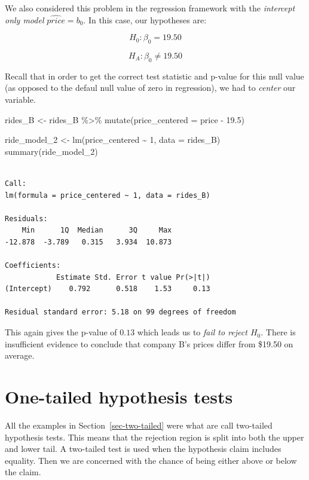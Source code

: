 \documentclass[
  letterpaper,
  DIV=11,
  numbers=noendperiod]{scrreprt}
\newenvironment{Shaded}{\begin{snugshade}}{\end{snugshade}}
\newcommand{\AttributeTok}[1]{\textcolor[rgb]{0.40,0.45,0.13}{#1}}
\newcommand{\DecValTok}[1]{\textcolor[rgb]{0.68,0.00,0.00}{#1}}
\newcommand{\FloatTok}[1]{\textcolor[rgb]{0.68,0.00,0.00}{#1}}
\newcommand{\FunctionTok}[1]{\textcolor[rgb]{0.28,0.35,0.67}{#1}}
\newcommand{\NormalTok}[1]{\textcolor[rgb]{0.00,0.23,0.31}{#1}}
\newcommand{\OtherTok}[1]{\textcolor[rgb]{0.00,0.23,0.31}{#1}}
\newcommand{\SpecialCharTok}[1]{\textcolor[rgb]{0.37,0.37,0.37}{#1}}
\theoremstyle{definition}
\theoremstyle{remark}
\begin{document}
We also considered this problem in the regression framework with the
\emph{intercept only model} \(\widehat{price} = b_0\). In this case, our
hypotheses are:

\[H_0: \beta_0 = 19.50\]

\[H_A: \beta_0 \neq 19.50\]

Recall that in order to get the correct test statistic and p-value for
this null value (as opposed to the defaul null value of zero in
regression), we had to \emph{center} our variable.

\begin{Shaded}
\begin{Highlighting}[]
\NormalTok{rides\_B }\OtherTok{\textless{}{-}}\NormalTok{ rides\_B }\SpecialCharTok{\%\textgreater{}\%} 
  \FunctionTok{mutate}\NormalTok{(}\AttributeTok{price\_centered =}\NormalTok{ price }\SpecialCharTok{{-}} \FloatTok{19.5}\NormalTok{)}

\NormalTok{ride\_model\_2 }\OtherTok{\textless{}{-}} \FunctionTok{lm}\NormalTok{(price\_centered }\SpecialCharTok{\textasciitilde{}} \DecValTok{1}\NormalTok{, }\AttributeTok{data =}\NormalTok{ rides\_B)}
\FunctionTok{summary}\NormalTok{(ride\_model\_2)}
\end{Highlighting}
\end{Shaded}

\begin{verbatim}

Call:
lm(formula = price_centered ~ 1, data = rides_B)

Residuals:
    Min      1Q  Median      3Q     Max 
-12.878  -3.789   0.315   3.934  10.873 

Coefficients:
            Estimate Std. Error t value Pr(>|t|)
(Intercept)    0.792      0.518    1.53     0.13

Residual standard error: 5.18 on 99 degrees of freedom
\end{verbatim}

This again gives the p-value of \(0.13\) which leads us to \emph{fail to
reject \(H_0\)}. There is insufficient evidence to conclude that company
B's prices differ from \$19.50 on average.

\hypertarget{one-tailed-hypothesis-tests}{%
\section{One-tailed hypothesis
tests}\label{one-tailed-hypothesis-tests}}

All the examples in Section~\ref{sec-two-tailed} were what are call
two-tailed hypothesis tests. This means that the rejection region is
split into both the upper and lower tail. A two-tailed test is used when
the hypothesis claim includes equality. Then we are concerned with the
chance of being either above or below the claim.
\end{document}
